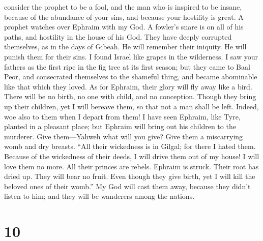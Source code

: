 consider the prophet to be a fool, and the man who is inspired to be
insane, because of the abundance of your sins, and because your
hostility is great.  A prophet watches over Ephraim with my
God. A fowler's snare is on all of his paths, and hostility in the house
of his God.  They have deeply corrupted themselves, as in
the days of Gibeah. He will remember their iniquity. He will punish them
for their sins.  I found Israel like grapes in the
wilderness. I saw your fathers as the first ripe in the fig tree at its
first season; but they came to Baal Peor, and consecrated themselves to
the shameful thing, and became abominable like that which they loved.
 As for Ephraim, their glory will fly away like a bird.
There will be no birth, no one with child, and no conception.
 Though they bring up their children, yet I will bereave
them, so that not a man shall be left. Indeed, woe also to them when I
depart from them!  I have seen Ephraim, like Tyre, planted
in a pleasant place; but Ephraim will bring out his children to the
murderer.  Give them---Yahweh what will you give? Give them
a miscarrying womb and dry breasts.  ``All their wickedness
is in Gilgal; for there I hated them. Because of the wickedness of their
deeds, I will drive them out of my house! I will love them no more. All
their princes are rebels.  Ephraim is struck. Their root
has dried up. They will bear no fruit. Even though they give birth, yet
I will kill the beloved ones of their womb.''  My God will
cast them away, because they didn't listen to him; and they will be
wanderers among the nations.

\hypertarget{section-5}{%
\section{10}\label{section-5}}

